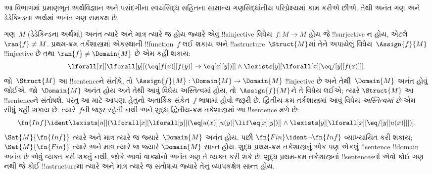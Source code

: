 \documentclass[../../../include/open-logic-section]{subfiles}
\begin{document}


આ વિભાગમાં પ્રમાણભૂત અર્થવિજ્ઞાન અને પસંદગીના સ્વયંસિદ્ધ સહિતના
સામાન્ય ગણસિદ્ધાંતીય પરિપ્રેક્ષ્યમાં કામ કરીએ છીએ. તેથી અનંત ગણ
અને ડેડેકિન્ડના અર્થમાં અનંત ગણ સમકક્ષ છે.

ગણ~$M$ (ડેડેકિન્ડના અર્થમાં) અનંત ત્યારે અને માત્ર ત્યારે જ હોય જ્યારે
એવું !!a{injective} વિધેય~$f\colon M
\to M$ હોય જે !!{surjective} ન હોય, એટલે $\ran{f} \neq M$. પ્રથમ-ક્રમ
તર્કશાસ્ત્રમાં એકસ્થાની !!{function}~$f$ લઈ શકાય અને
!!a{structure}~$\Struct{M}$માં તેને અપાયેલું વિધેય~$\Assign{f}{M}$
!!{injective} છે તથા $\ran{f} \neq
\Domain{M}$ છે એમ કહી શકાય:
\[
\lforall[x][\lforall[y][(\eq[f(x)][f(y)] \to \eq[x][y])]] \land
\lexists[y][\lforall[x][\eq/[y][f(x)]]].
\]
જો~$\Struct{M}$ આ !!{sentence}ને સંતોષે, તો
$\Assign{f}{M}:
\Domain{M} \to \Domain{M}$ !!{injective} છે અને તેથી~$\Domain{M}$
અનંત હોવું જોઈએ. જો~$\Domain{M}$ અનંત હોય અને તેથી આવું વિધેય
અસ્તિત્વમાં હોય, તો~$\Assign{f}{M}$ને તે વિધેય લઈએ; ત્યારે
$\Struct{M}$ આ !!{sentence}ને સંતોષશે. પરંતુ આ માટે આપણા હેતુનો
અતાર્કિક સંકેત~$f$ ભાષામાં હોવો જરૂરી છે. દ્વિતીય-ક્રમ તર્કશાસ્ત્રમાં
આવું વિધેય \emph{અસ્તિત્વમાં છે} એમ સીધું કહી શકાય છે. ત્યારે~$f$ની
જરૂર રહેતી નથી અને શુદ્ધ દ્વિતીય-ક્રમ તર્કશાસ્ત્રમાં આ !!{sentence}
મળે છે:
\[
\fn{Inf} \ident \lexists[u][(\lforall[x][\lforall[y][(\eq[u(x)][u(y)]
      \lif \eq[x][y])]] \land \lexists[y][\lforall[x][\eq/[y][u(x)]]])].
\]
$\Sat{M}{\fn{Inf}}$ ત્યારે અને માત્ર ત્યારે જ જ્યારે~$\Domain{M}$
અનંત હોય. પછી $\fn{Fin} \ident \lnot \fn{Inf}$ વ્યાખ્યાયિત કરી
શકાય; $\Sat{M}{\fn{Fin}}$ ત્યારે અને માત્ર ત્યારે જ જ્યારે
$\Domain{M}$ સાન્ત હોય. શુદ્ધ પ્રથમ-ક્રમ તર્કશાસ્ત્રનું એક પણ એકલું
!!{sentence} !!{domain} અનંત છે એવું વ્યક્ત કરી શકતું નથી, જોકે
આવાં વાક્યોનો અનંત ગણ તે વ્યક્ત કરી શકે છે. શુદ્ધ પ્રથમ-ક્રમ
તર્કશાસ્ત્રનાં !!{sentence}sનો એવો કોઈ ગણ નથી જે કોઈ
!!a{structure}માં ત્યારે અને માત્ર ત્યારે જ સંતોષાય જ્યારે તેનું
વ્યાપકક્ષેત્ર સાન્ત હોય.
\end{document}
